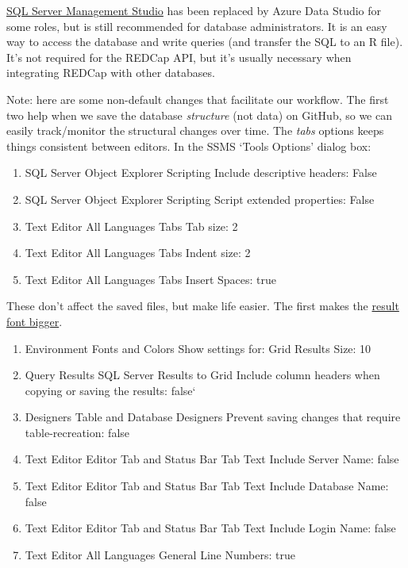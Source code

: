 \documentclass[
]{book}
\providecommand{\tightlist}{%
  \setlength{\itemsep}{0pt}\setlength{\parskip}{0pt}}
\begin{document}
\href{https://docs.microsoft.com/en-us/sql/ssms/download-sql-server-management-studio-ssms}{SQL Server Management Studio} has been replaced by Azure Data Studio for some roles, but is still recommended for database administrators. It is an easy way to access the database and write queries (and transfer the SQL to an R file). It's not required for the REDCap API, but it's usually necessary when integrating REDCap with other databases.

Note: here are some non-default changes that facilitate our workflow. The first two help when we save the database \emph{structure} (not data) on GitHub, so we can easily track/monitor the structural changes over time. The \emph{tabs} options keeps things consistent between editors. In the SSMS `Tools \textbar{} Options' dialog box:

\begin{enumerate}
\def\labelenumi{\arabic{enumi}.}
\tightlist
\item
  SQL Server Object Explorer \textbar{} Scripting \textbar{} Include descriptive headers: False
\item
  SQL Server Object Explorer \textbar{} Scripting \textbar{} Script extended properties: False
\item
  Text Editor \textbar{} All Languages \textbar{} Tabs \textbar{} Tab size: 2
\item
  Text Editor \textbar{} All Languages \textbar{} Tabs \textbar{} Indent size: 2
\item
  Text Editor \textbar{} All Languages \textbar{} Tabs \textbar{} Insert Spaces: true
\end{enumerate}

These don't affect the saved files, but make life easier. The first makes the \href{https://blog.sqlauthority.com/2016/05/31/sql-server-ssms-tip-get-larger-fonts-results-grid-output/}{result font bigger}.

\begin{enumerate}
\def\labelenumi{\arabic{enumi}.}
\item
  Environment \textbar{} Fonts and Colors \textbar{} Show settings for: Grid Results \textbar{} Size: 10
\item
  Query Results \textbar{} SQL Server \textbar{} Results to Grid \textbar{} Include column headers when copying or saving the results: false`
\item
  Designers \textbar{} Table and Database Designers \textbar{} Prevent saving changes that require table-recreation: false
\item
  Text Editor \textbar{} Editor Tab and Status Bar \textbar{} Tab Text \textbar{} Include Server Name: false
\item
  Text Editor \textbar{} Editor Tab and Status Bar \textbar{} Tab Text \textbar{} Include Database Name: false
\item
  Text Editor \textbar{} Editor Tab and Status Bar \textbar{} Tab Text \textbar{} Include Login Name: false
\item
  Text Editor \textbar{} All Languages \textbar{} General \textbar{} Line Numbers: true
\end{enumerate}
\end{document}
